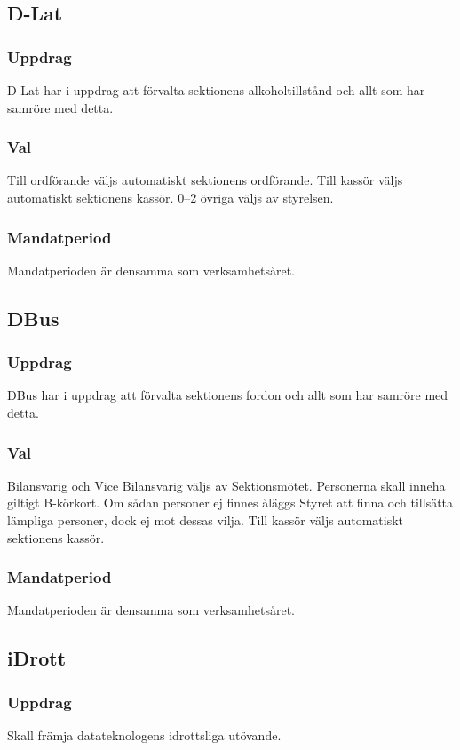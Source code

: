 \subsection{D-Lat}
\subsubsection{Uppdrag} 
D-Lat har i uppdrag att förvalta sektionens alkoholtillstånd och allt som har samröre med detta.
\subsubsection{Val}
Till ordförande väljs automatiskt sektionens ordförande. Till kassör väljs automatiskt sektionens kassör. 0--2 övriga väljs av styrelsen.
\subsubsection{Mandatperiod}
Mandatperioden är densamma som verksamhetsåret.

\subsection{DBus}
\subsubsection{Uppdrag}
DBus har i uppdrag att förvalta sektionens fordon och allt som har samröre med detta.
\subsubsection{Val}
Bilansvarig och Vice Bilansvarig väljs av Sektionsmötet. Personerna skall inneha giltigt B-körkort. Om sådan personer ej finnes åläggs Styret att finna och tillsätta lämpliga personer, dock ej mot dessas vilja. Till kassör väljs automatiskt sektionens kassör.
\subsubsection{Mandatperiod}
Mandatperioden är densamma som verksamhetsåret.


\subsection{iDrott}
\subsubsection{Uppdrag}
Skall främja datateknologens idrottsliga utövande. 
